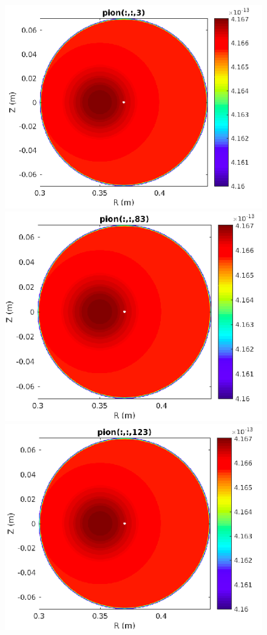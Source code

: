 \documentclass[12pt,oneside,a4paper]{abntex2}
\begin{document}
\begin{figure}[H]
\centering
\includegraphics[scale=0.4]{../SImulacao_breakdown/Adaptacao_nova/explicito/i3.png}  
\includegraphics[scale=0.4]{../SImulacao_breakdown/Adaptacao_nova/explicito/i83.png} 
\includegraphics[scale=0.4]{../SImulacao_breakdown/Adaptacao_nova/explicito/i123.png} 

\end{figure}
\end{document}
